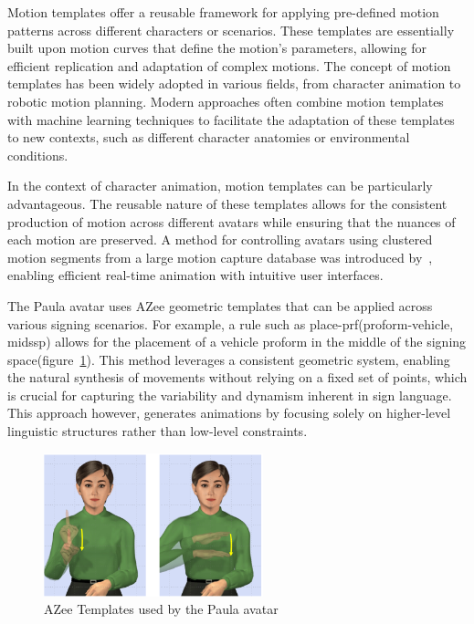\documentclass[../../main.tex]{subfiles}
\begin{document}
Motion templates offer a reusable framework for applying pre-defined motion patterns across different characters or scenarios. These templates are essentially built upon motion curves that define the motion's parameters, allowing for efficient replication and adaptation of complex motions. The concept of motion templates has been widely adopted in various fields, from character animation to robotic motion planning. Modern approaches often combine motion templates with machine learning techniques to facilitate the adaptation of these templates to new contexts, such as different character anatomies or environmental conditions.

In the context of character animation, motion templates can be particularly advantageous. The reusable nature of these templates allows for the consistent production of motion across different avatars while ensuring that the nuances of each motion are preserved. A method for controlling avatars using clustered motion segments from a large motion capture database was introduced by~\cite{10.1145/566654.566607}, enabling efficient real-time animation with intuitive user interfaces.

The Paula avatar uses AZee geometric templates that can be applied across various signing scenarios. For example, a rule such as place-prf(proform-vehicle, midssp) allows for the placement of a vehicle proform in the middle of the signing space(figure~\ref{fig:azee_template_example}). This method leverages a consistent geometric system, enabling the natural synthesis of movements without relying on a fixed set of points, which is crucial for capturing the variability and dynamism inherent in sign language. This approach however, generates animations by focusing solely on higher-level linguistic structures rather than low-level constraints.

\begin{figure}
    \centering \includegraphics[width = 2.5in]{chapters/intermediate_blocks/images/azee_template_example.png}
    \caption{AZee Templates used by the Paula avatar}
    \label{fig:azee_template_example}
\end{figure}
\end{document}
